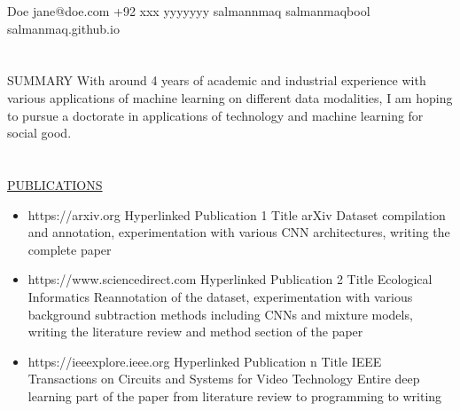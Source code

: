 \documentclass{my_cv}
\begin{document}
    {Doe} %
    {jane@doe.com} %
    {+92 xxx yyyyyyy} %
    {salmannmaq} %
    {salmanmaqbool} %
    {salmanmaq.github.io} %

\section{\faFileText}{SUMMARY}
    With around 4 years of academic and industrial experience with various applications of machine learning on different data modalities, I am hoping to pursue a doctorate in applications of technology and machine learning for social good.

\section{\faBook}{\href{https://scholar.google.com/citations?user=J45X8TMAAAAJ&hl=en}{PUBLICATIONS}}
    \begin{itemize}
        \item 
                {https://arxiv.org} %
                {Hyperlinked Publication 1 Title} %
                {arXiv} %
                {Dataset compilation and annotation, experimentation with various CNN architectures, writing the complete paper} %
        \item 
                {https://www.sciencedirect.com}
                {Hyperlinked Publication 2 Title}
                {Ecological Informatics}
                {Reannotation of the dataset, experimentation with various background subtraction methods including CNNs and mixture models, writing the literature review and method section of the paper}
        \item 
                {https://ieeexplore.ieee.org}
                {Hyperlinked Publication n Title}
                {IEEE Transactions on Circuits and Systems for Video Technology}
                {Entire deep learning part of the paper from literature review to programming to writing}
    \end{itemize}
\end{document}
